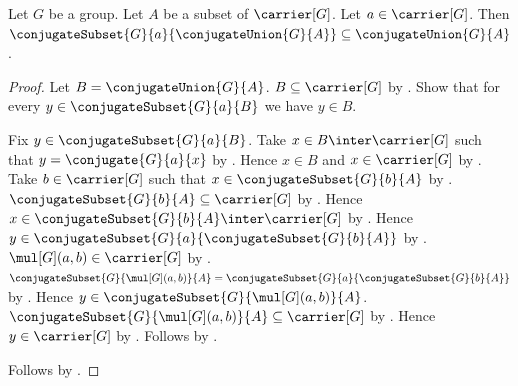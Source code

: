 \begin{theorem}\label{conjugate_union_closed_under_conjugation}
    Let $G$ be a group.
    Let $A$ be a subset of $\carrier[G]$.
    Let $a\in\carrier[G]$.
    Then
        $\conjugateSubset{G}{a}{\conjugateUnion{G}{A}}
            \subseteq\conjugateUnion{G}{A}$.
\end{theorem}
\begin{proof}
    Let $B=\conjugateUnion{G}{A}$.
    $B\subseteq\carrier[G]$ by
        .
    Show that for every $y\in\conjugateSubset{G}{a}{B}$ we have
        $y\in B$.
    \begin{subproof}
        Fix $y\in\conjugateSubset{G}{a}{B}$.
        Take $x\in B\inter\carrier[G]$ such that
            $y=\conjugate{G}{a}{x}$ by
            .
        Hence $x\in B$ and $x\in\carrier[G]$ by
            .
        Take $b\in\carrier[G]$ such that
            $x\in\conjugateSubset{G}{b}{A}$ by
            .
        $\conjugateSubset{G}{b}{A}\subseteq\carrier[G]$ by
            .
        Hence $x\in\conjugateSubset{G}{b}{A}\inter\carrier[G]$ by
            .
        Hence $y\in
            \conjugateSubset{G}{a}{\conjugateSubset{G}{b}{A}}$ by
            .
        $\mul[G](a,b)\in\carrier[G]$ by
            .
        $\conjugateSubset{G}{\mul[G](a,b)}{A}=
            \conjugateSubset{G}{a}{\conjugateSubset{G}{b}{A}}$ by
            .
        Hence $y\in\conjugateSubset{G}{\mul[G](a,b)}{A}$.
        $\conjugateSubset{G}{\mul[G](a,b)}{A}
            \subseteq\carrier[G]$ by
            .
        Hence $y\in\carrier[G]$ by .
        Follows by .
    \end{subproof}
    Follows by .
\end{proof}

